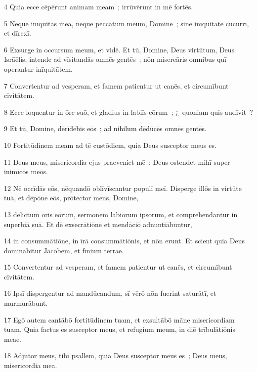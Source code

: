 \psalmVerse
  {\phantom{00}4}
  {Quia ecce cēpērunt animam meam~; irrūvērunt in mē fortēs.}


\psalmVerse
  {\phantom{00}5}
  {Neque inīquitās mea, neque peccātum meum, Domine~; sine inīquitāte cucurrī, et dīrexī.}


\psalmVerse
  {\phantom{00}6}
  {Exsurge in occursum meum, et vidē. Et tū, Domine, Deus virtūtum, Deus Isrāēlis, intende ad vīsitandās omnēs gentēs~; nōn misereāris omnibus quī operantur inīquitātem.}


\psalmVerse
  {\phantom{00}7}
  {Convertentur ad vesperam, et famem patientur ut canēs, et circumībunt cīvitātem.}


\psalmVerse
  {\phantom{00}8}
  {Ecce loquentur in ōre suō, et gladius in labiīs eōrum~; ¿~quoniam quis audīvit~?}


\psalmVerse
  {\phantom{00}9}
  {Et tū, Domine, dērīdēbis eōs~; ad nihilum dēdūcēs omnēs gentēs.}


\psalmVerse
  {\phantom{0}10}
  {Fortitūdinem meam ad tē custōdiem, quia Deus susceptor meus es.}


\psalmVerse
  {\phantom{0}11}
  {Deus meus, misericordia ejus praeveniet mē~; Deus ostendet mihī super inimīcōs meōs.}


\psalmVerse
  {\phantom{0}12}
  {Nē occīdās eōs, nēquandō oblīvīscantur populī meī. Disperge illōs in virtūte tuā, et dēpōne eōs, prōtector meus, Domine,}


\psalmVerse
  {\phantom{0}13}
  {dēlictum ōris eōrum, sermōnem labiōrum ipsōrum, et comprehendantur in superbiā suā. Et dē exsecrātiōne et mendāciō adnuntiābuntur,}


\psalmVerse
  {\phantom{0}14}
  {in consummātiōne, in īrā consummātiōnis, et nōn erunt. Et scient quia Deus dominābitur Jācōbem, et fīnium terrae.}


\psalmVerse
  {\phantom{0}15}
  {Convertentur ad vesperam, et famem patientur ut canēs, et circumībunt cīvitātem.}


\psalmVerse
  {\phantom{0}16}
  {Ipsī dispergentur ad mandūcandum, sī vērō nōn fuerint saturātī, et murmurābunt.}


\psalmVerse
  {\phantom{0}17}
  {Egō autem cantābō fortitūdinem tuam, et exsultābō māne misericordiam tuam. Quia factus es susceptor meus, et refugium meum, in diē trībulātiōnis meae.}


\psalmVerse
  {\phantom{0}18}
  {Adjūtor meus, tibī psallem, quia Deus susceptor meus es~; Deus meus, misericordia mea.}




